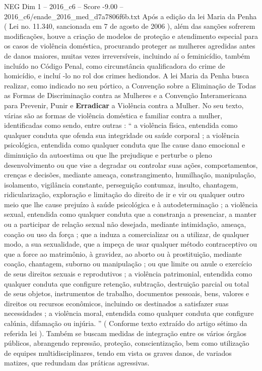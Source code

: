 \begin{textsample}{NEG Dim 1 – 2016\_c6 – Score -9.00 – 2016\_c6/enade\_2016\_med\_d7a7806f6b.txt}
Após a edição da lei Maria da Penha ( Lei no. 11.340, sancionada em 7 de agosto de 2006 ), além das sanções sofrerem modificações, houve a criação de modelos de proteção e atendimento especial para os casos de violência doméstica, procurando proteger as mulheres agredidas antes de danos maiores, muitas vezes irreversíveis, incluindo aí o feminicídio, também incluído no Código Penal, como circunstância qualificadora do crime de homicídio, e incluí -lo no rol dos crimes hediondos.
A lei Maria da Penha busca realizar, como indicado no seu pórtico, a Convenção sobre a Eliminação de Todas as Formas de Discriminação contra as Mulheres e a Convenção Interamericana para Prevenir, Punir e \textbf{Erradicar} a Violência contra a Mulher.
No seu texto, várias são as formas de violência doméstica e familiar contra a mulher, identificadas como sendo, entre outras : “ a violência física, entendida como qualquer conduta que ofenda sua integridade ou saúde corporal ; a violência psicológica, entendida como qualquer conduta que lhe cause dano emocional e diminuição da autoestima ou que lhe prejudique e perturbe o pleno desenvolvimento ou que vise a degradar ou controlar suas ações, comportamentos, crenças e decisões, mediante ameaça, constrangimento, humilhação, manipulação, isolamento, vigilância constante, perseguição contumaz, insulto, chantagem, ridicularização, exploração e limitação do direito de ir e vir ou qualquer outro meio que lhe cause prejuízo à saúde psicológica e à autodeterminação ; a violência sexual, entendida como qualquer conduta que a constranja a presenciar, a manter ou a participar de relação sexual não desejada, mediante intimidação, ameaça, coação ou uso da força ; que a induza a comercializar ou a utilizar, de qualquer modo, a sua sexualidade, que a impeça de usar qualquer método contraceptivo ou que a force ao matrimônio, à gravidez, ao aborto ou à prostituição, mediante coação, chantagem, suborno ou manipulação ; ou que limite ou anule o exercício de seus direitos sexuais e reprodutivos ; a violência patrimonial, entendida como qualquer conduta que configure retenção, subtração, destruição parcial ou total de seus objetos, instrumentos de trabalho, documentos pessoais, bens, valores e direitos ou recursos econômicos, incluindo os destinados a satisfazer suas necessidades ; a violência moral, entendida como qualquer conduta que configure calúnia, difamação ou injúria. ” ( Conforme texto extraído do artigo sétimo da referida lei ).
Também se buscam medidas de integração entre os vários órgãos públicos, abrangendo repressão, proteção, conscientização, bem como utilização de equipes multidisciplinares, tendo em vista os graves danos, de variados matizes, que redundam das práticas agressivas.

\end{textsample}
